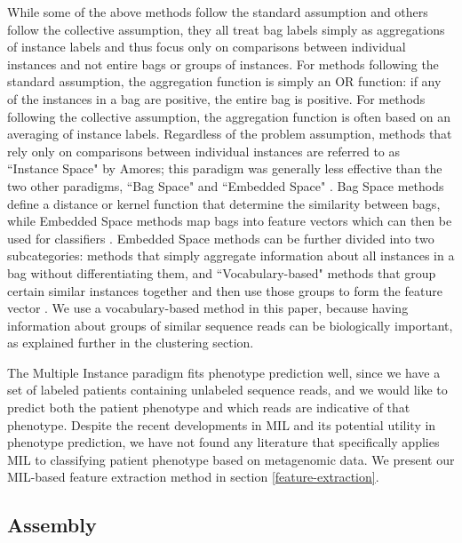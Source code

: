 While some of the above methods follow the standard assumption and others follow the collective assumption, they all treat bag labels simply as aggregations of instance labels and thus focus only on comparisons between individual instances and not entire bags or groups of instances. For methods following the standard assumption, the aggregation function is simply an OR function: if any of the instances in a bag are positive, the entire bag is positive. For methods following the collective assumption, the aggregation function is often based on an averaging of instance labels. Regardless of the problem assumption, methods that rely only on comparisons between individual instances are referred to as ``Instance Space" by Amores; this paradigm was generally  less effective than the two other paradigms, ``Bag Space" and ``Embedded Space" \cite{amores13}. Bag Space methods define a distance or kernel function that determine the similarity between bags, while Embedded Space methods map bags into feature vectors which can then be used for classifiers \cite{amores13}. Embedded Space methods can be further divided into two subcategories: methods that simply aggregate information about all instances in a bag without differentiating them, and ``Vocabulary-based" methods that group certain similar instances together and then use those groups to form the feature vector \cite{amores13}. We use a vocabulary-based method in this paper, because having information about groups of similar sequence reads can be biologically important, as explained further in the clustering section.

The Multiple Instance paradigm fits phenotype prediction well, since we have a set of labeled patients containing unlabeled sequence reads, and we would like to predict both the patient phenotype and which reads are indicative of that phenotype. Despite the recent developments in MIL and its potential utility in phenotype prediction, we have not found any literature that specifically applies MIL to classifying patient phenotype based on metagenomic data. We present our MIL-based feature extraction method in section \ref{feature-extraction}.

\subsection{Assembly}


